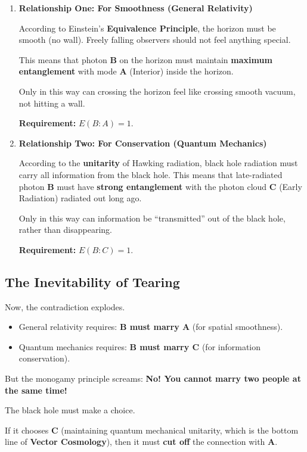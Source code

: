 \begin{enumerate}
\item \textbf{Relationship One: For Smoothness (General Relativity)}

   According to Einstein's \textbf{Equivalence Principle}, the horizon must be smooth (no wall). Freely falling observers should not feel anything special.

   This means that photon \textbf{B} on the horizon must maintain \textbf{maximum entanglement} with mode \textbf{A} (Interior) inside the horizon.

   Only in this way can crossing the horizon feel like crossing smooth vacuum, not hitting a wall.

   \textbf{Requirement:} $E(B:A) = 1$.

\item \textbf{Relationship Two: For Conservation (Quantum Mechanics)}

   According to the \textbf{unitarity} of Hawking radiation, black hole radiation must carry all information from the black hole. This means that late-radiated photon \textbf{B} must have \textbf{strong entanglement} with the photon cloud \textbf{C} (Early Radiation) radiated out long ago.

   Only in this way can information be ``transmitted'' out of the black hole, rather than disappearing.

   \textbf{Requirement:} $E(B:C) = 1$.
\end{enumerate}

\subsection{The Inevitability of Tearing}

Now, the contradiction explodes.

\begin{itemize}
\item General relativity requires: \textbf{B must marry A} (for spatial smoothness).

\item Quantum mechanics requires: \textbf{B must marry C} (for information conservation).
\end{itemize}

But the monogamy principle screams: \textbf{No! You cannot marry two people at the same time!}

The black hole must make a choice.

If it chooses \textbf{C} (maintaining quantum mechanical unitarity, which is the bottom line of \textbf{Vector Cosmology}), then it must \textbf{cut off} the connection with \textbf{A}.

